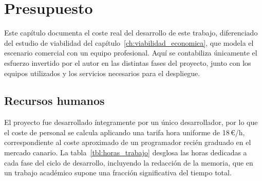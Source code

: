 \chapter{Presupuesto}
\label{ch:presupuesto}

Este capítulo documenta el coste real del desarrollo de este trabajo, diferenciado del estudio de viabilidad del capítulo~\ref{ch:viabilidad_economica}, que modela el escenario comercial con un equipo profesional. Aquí se contabiliza únicamente el esfuerzo invertido por el autor en las distintas fases del proyecto, junto con los equipos utilizados y los servicios necesarios para el despliegue.

\section{Recursos humanos}
\label{sec:presupuesto_rrhh}

El proyecto fue desarrollado íntegramente por un único desarrollador, por lo que el coste de personal se calcula aplicando una tarifa hora uniforme de 18\,€/h, correspondiente al coste aproximado de un programador recién graduado en el mercado canario. La tabla~\ref{tbl:horas_trabajo} desglosa las horas dedicadas a cada fase del ciclo de desarrollo, incluyendo la redacción de la memoria, que en un trabajo académico supone una fracción significativa del tiempo total.

